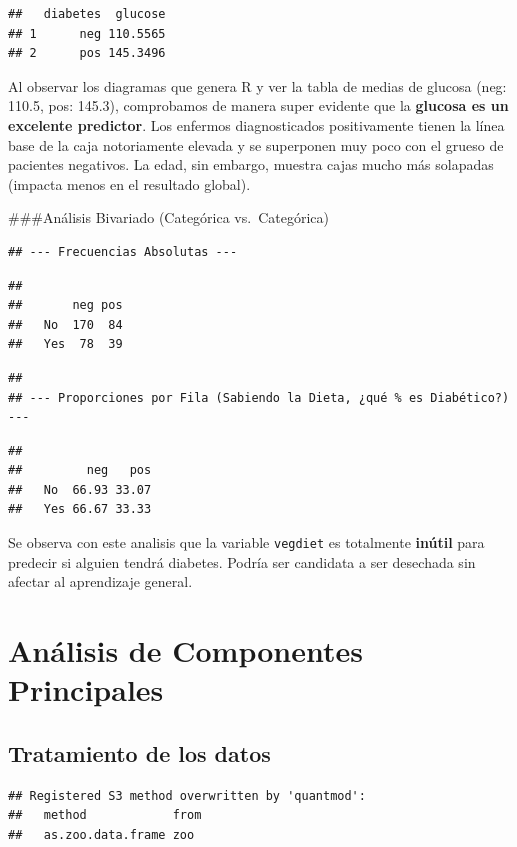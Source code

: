 \documentclass[
]{article}
\begin{document}
\begin{verbatim}
##   diabetes  glucose
## 1      neg 110.5565
## 2      pos 145.3496
\end{verbatim}

Al observar los diagramas que genera R y ver la tabla de medias de
glucosa (neg: 110.5, pos: 145.3), comprobamos de manera super evidente
que la \textbf{glucosa es un excelente predictor}. Los enfermos
diagnosticados positivamente tienen la línea base de la caja
notoriamente elevada y se superponen muy poco con el grueso de pacientes
negativos. La edad, sin embargo, muestra cajas mucho más solapadas
(impacta menos en el resultado global).

\#\#\#Análisis Bivariado (Categórica vs.~Categórica)

\begin{verbatim}
## --- Frecuencias Absolutas ---
\end{verbatim}

\begin{verbatim}
##      
##       neg pos
##   No  170  84
##   Yes  78  39
\end{verbatim}

\begin{verbatim}
## 
## --- Proporciones por Fila (Sabiendo la Dieta, ¿qué % es Diabético?) ---
\end{verbatim}

\begin{verbatim}
##      
##         neg   pos
##   No  66.93 33.07
##   Yes 66.67 33.33
\end{verbatim}

Se observa con este analisis que la variable \texttt{vegdiet} es
totalmente \textbf{inútil} para predecir si alguien tendrá diabetes.
Podría ser candidata a ser desechada sin afectar al aprendizaje general.

\section{Análisis de Componentes
Principales}\label{anuxe1lisis-de-componentes-principales}

\subsection{Tratamiento de los datos}\label{tratamiento-de-los-datos}

\begin{verbatim}
## Registered S3 method overwritten by 'quantmod':
##   method            from
##   as.zoo.data.frame zoo
\end{verbatim}
\end{document}
